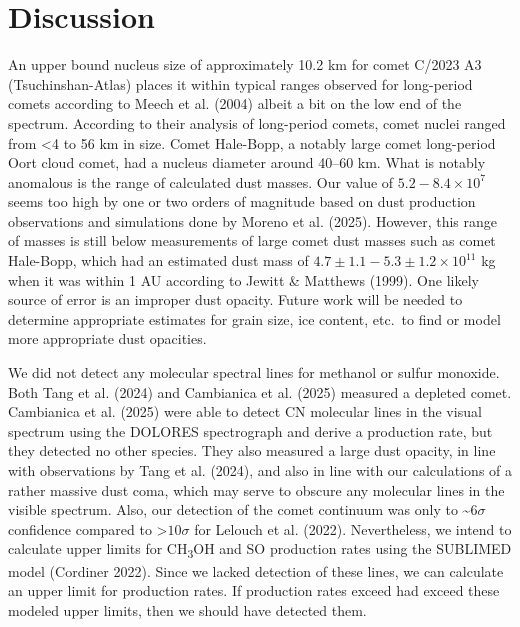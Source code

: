 \section{Discussion}\label{discussion}

An upper bound nucleus size of approximately 10.2 km for comet C/2023 A3 (Tsuchinshan-Atlas) places it within typical ranges observed for
long-period comets according to Meech et al. (2004) albeit a bit on the low end of the spectrum. According to their analysis of long-period comets, comet nuclei ranged from \textless{4} to 56 km in size. Comet Hale-Bopp, a notably large comet long-period Oort cloud comet, had a nucleus diameter around 40--60 km. What is notably anomalous is the range of calculated dust masses. Our value of
\(5.2 - 8.4 \times 10^{7}\) seems too high by one or two orders of magnitude based on dust production observations and simulations done by
Moreno et al. (2025). However, this range of masses is still below measurements of large comet dust masses such as comet Hale-Bopp, which
had an estimated dust mass of \(4.7 \pm 1.1 - 5.3 \pm 1.2 \times 10^{11}\) kg when it was within 1 AU according to Jewitt \& Matthews (1999). One likely source of error is an improper dust opacity. Future work will be needed to determine appropriate estimates for grain size, ice content, etc.\ to find or model more appropriate dust opacities.

We did not detect any molecular spectral lines for methanol or sulfur monoxide. Both Tang et al. (2024) and Cambianica et al. (2025) measured a depleted comet. Cambianica et al. (2025) were able to detect CN molecular lines in the visual spectrum using the DOLORES spectrograph and derive a production rate, but they detected no other species. They also measured a large dust opacity, in line with observations by Tang et al. (2024), and also in line with our calculations of a rather massive dust coma, which may serve to obscure any molecular lines in the visible spectrum. Also, our detection of the comet continuum was only to \textasciitilde{}\(6\sigma\) confidence compared to \textgreater\(10\sigma\) for Lelouch et al. (2022). Nevertheless, we intend to calculate upper limits for CH\textsubscript{3}OH and SO production rates using the SUBLIMED model (Cordiner 2022). Since we lacked detection of these lines, we can calculate an upper limit for production rates. If production rates exceed had exceed these modeled upper limits, then we should have detected them.
